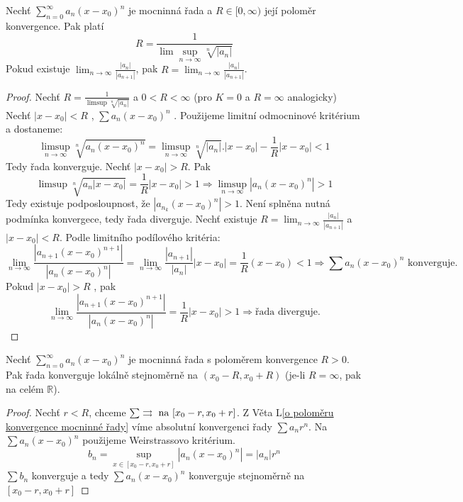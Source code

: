 \begin{vetal}
Nechť $\sum_{n=0}^{\infty} a_n (x-x_0)^n$ je mocninná řada a $R \in [ 0, \infty)$ její poloměr konvergence. Pak platí
$$R = \frac{1}{ \lim \sup_{n \rightarrow \infty} \sqrt[n]{| a_n |} }$$
Pokud existuje $\lim_{n \rightarrow \infty} \frac{|a_n|}{|a_{n+1}|}$, pak $R = \lim_{n \rightarrow \infty} \frac{|a_n|}{|a_{n+1}|}$.
\end{vetal}

\begin{proof}
Nechť $R = \frac{1}{\limsup \sqrt[n]{|a_n|}}$ a $0<R<\infty$ (pro $K = 0$ a $R = \infty$ analogicky)
Nechť $|x-x_0| < R$ , $\sum a_n(x-x_0)^n$ . Použijeme limitní odmocninové kritérium a dostaneme:
$$\limsup_{n \to \infty} \sqrt[n]{a_n(x-x_0)^n} = \limsup_{n \to \infty} \sqrt[n]{|a_n|} . |x-x_0| - \frac{1}{R} |x-x_0| < 1$$
Tedy řada konverguje.
Nechť $|x-x_0|>R$. Pak 
$$\limsup \sqrt[n]{a_n|x-x_0|} = \frac{1}{R}|x-x_0| > 1 \Rightarrow \limsup_{n \to \infty} |a_n(x-x_0)^n| > 1$$
Tedy existuje podposloupnost, že $|a_{n_k} (x-x_0)^n| > 1$. Není splněna nutná podmínka konvergece, tedy řada diverguje.
Nechť existuje $R = \lim_{n \to \infty } \frac{|a_n|}{|a_{n+1}|}$ a $|x-x_0|< R$. Podle limitního podílového kritéria:
$$\lim_{n \to \infty} \frac{|a_{n+1}(x-x_0)^{n+1}|}{|a_n(x-x_0)^n|} = \lim_{n \to \infty} \frac{|a_{n+1}|}{|a_n|} |x-x_0| = \frac{1}{R} (x-x_0) < 1 \Rightarrow \sum a_n(x-x_0)^n \textrm{ konverguje.}$$
Pokud $|x-x_0| > R$ , pak 
$$\lim_{n \to \infty} \frac{|a_{n+1}(x-x_0)^{n+1}|}{|a_n(x-x_0)^n|} = \frac{1}{R}|x-x_0|>1 \Rightarrow \textrm{řada diverguje.}$$
\end{proof}

\begin{vetal}
\label{o stejnoměrné konvergenci mocninné řady}
Nechť $\sum_{n=0}^{\infty} a_n (x-x_0)^n$ je mocninná řada s poloměrem konvergence $R > 0$.  Pak řada konverguje lokálně stejnoměrně na $(x_0 - R, x_0 + R)$ (je-li $R=\infty$, pak na celém $\mathbb{R}$).
\end{vetal}

\begin{proof}
Nechť $r < R$, chceme $\sum \rightrightarrows \textrm{ na } [x_0-r,x_0+r]$. Z Věta L\ref{o poloměru konvergence mocninné řady} víme absolutní konvergenci řady $\sum a_n r^n$. Na $ \sum a_n(x-x_0)^n$ použijeme Weirstrassovo kritérium.
$$b_n = \sup_{x \in[x_0-r, x_0+r]} |a_n(x-x_0)^n| = |a_n|r^n$$
$\sum b_n$ konverguje a tedy $\sum a_n (x-x_0)^n$ konverguje stejnoměrně na $[x_0-r, x_0+r]$
\end{proof}

